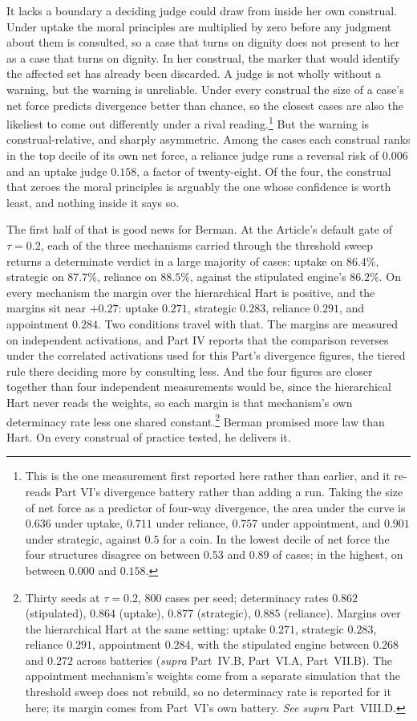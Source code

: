It lacks a boundary a deciding judge could draw from inside her own
construal. Under uptake the moral principles are multiplied by zero
before any judgment about them is consulted, so a case that turns on
dignity does not present to her as a case that turns on dignity. In her construal, the marker that would identify the affected set has
already been discarded. A judge is not wholly without a warning, but the warning is unreliable. Under
every construal the size of a case's net force predicts divergence better than
chance, so the closest cases are also the likeliest to come out differently
under a rival reading.\footnote{This is the one measurement first reported here rather than earlier, and it
re-reads Part VI's divergence battery rather than adding a run. Taking the
size of net force as a predictor of four-way divergence, the area under the
curve is $0.636$ under uptake, $0.711$ under reliance, $0.757$ under
appointment, and $0.901$ under strategic, against $0.5$ for a coin. In the
lowest decile of net force the four structures disagree on between $0.53$ and
$0.89$ of cases; in the highest, on between $0.000$ and $0.158$.} But the warning is construal-relative, and sharply asymmetric. Among the cases
each construal ranks in the top decile of its own net force, a reliance judge
runs a reversal risk of $0.006$ and an uptake judge $0.158$, a factor of
twenty-eight. Of the four, the construal that zeroes the moral principles is arguably the
one whose confidence is worth least, and nothing inside it says so.

The first half of that is good news for Berman. At the Article's default
gate of $\tau = 0.2$, each of the three mechanisms carried through the
threshold sweep returns a determinate verdict in a large majority of
cases: uptake on $86.4\%$, strategic on $87.7\%$, reliance on $88.5\%$,
against the stipulated engine's $86.2\%$. On every mechanism the margin over the hierarchical Hart is positive, and the
margins sit near $+0.27$: uptake $0.271$, strategic $0.283$, reliance $0.291$,
and appointment $0.284$. Two conditions travel with that. The margins are
measured on independent activations, and Part IV reports that the comparison
reverses under the correlated activations used for this Part's divergence
figures, the tiered rule there deciding more by consulting less.
And the four figures are closer together than four independent measurements
would be, since the hierarchical Hart never reads the weights, so each margin
is that mechanism's own determinacy rate less one shared constant.\footnote{Thirty seeds at $\tau = 0.2$, $800$ cases
per seed; determinacy rates $0.862$ (stipulated), $0.864$ (uptake),
$0.877$ (strategic), $0.885$ (reliance). Margins over the hierarchical
Hart at the same setting: uptake $0.271$, strategic $0.283$, reliance
$0.291$, appointment $0.284$, with the stipulated engine between $0.268$
and $0.272$ across batteries (\textit{supra} Part~IV.B, Part~VI.A,
Part~VII.B). The appointment mechanism's weights come from a separate
simulation that the threshold sweep does not rebuild, so no determinacy
rate is reported for it here; its margin comes from Part~VI's own
battery. \textit{See supra} Part~VIII.D.} Berman promised more law than
Hart. On every construal of practice tested, he delivers it.


